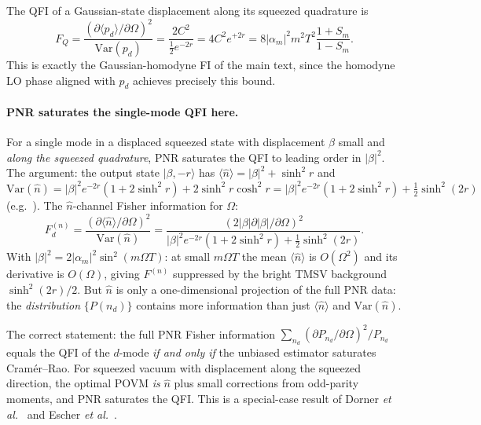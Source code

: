 \documentclass[11pt]{article}
\begin{document}
The QFI of a Gaussian-state displacement along its squeezed
quadrature is~\cite{Pinel2012}
\begin{equation}
  F_Q = \frac{(\partial\langle p_d\rangle/\partial\Omega)^2}
             {\mathrm{Var}(p_d)}
  = \frac{2C^2}{\tfrac12 e^{-2r}}
  = 4 C^2 e^{+2r}
  = 8|\alpha_m|^2 m^2 T^2 \frac{1+S_m}{1-S_m}.
\end{equation}
This is exactly the Gaussian-homodyne FI of the main text, since the
homodyne LO phase aligned with $p_d$ achieves precisely this bound.

\paragraph{PNR saturates the single-mode QFI here.}  For a single
mode in a displaced squeezed state with displacement $\beta$ small
and \emph{along the squeezed quadrature}, PNR saturates the QFI to
leading order in $|\beta|^2$.  The argument: the output state
$|\beta,-r\rangle$ has $\langle\hat n\rangle = |\beta|^2 +
\sinh^2 r$ and
$\mathrm{Var}(\hat n) = |\beta|^2 e^{-2r}(1+2\sinh^2 r)
+ 2\sinh^2 r\cosh^2 r
= |\beta|^2 e^{-2r}(1+2\sinh^2 r)+\tfrac12\sinh^2(2r)$
(e.g.\ \cite{Marian1992,Caruso2008}).  The $\hat n$-channel Fisher
information for $\Omega$:
\begin{equation}
  F^{(n)}_d
  = \frac{(\partial\langle\hat n\rangle/\partial\Omega)^2}
         {\mathrm{Var}(\hat n)}
  = \frac{(2|\beta|\partial|\beta|/\partial\Omega)^2}
         {|\beta|^2 e^{-2r}(1+2\sinh^2 r)+\tfrac12\sinh^2(2r)}.
\end{equation}
With $|\beta|^2 = 2|\alpha_m|^2\sin^2(m\Omega T)$: at small $m\Omega T$
the mean $\langle\hat n\rangle$ is $O(\Omega^2)$ and its derivative is
$O(\Omega)$, giving $F^{(n)}$ suppressed by the bright TMSV background
$\sinh^2(2r)/2$.  But $\hat n$ is only a one-dimensional projection
of the full PNR data: the \emph{distribution} $\{P(n_d)\}$ contains
more information than just $\langle\hat n\rangle$ and
$\mathrm{Var}(\hat n)$.

The correct statement: the full PNR Fisher information
$\sum_{n_d}(\partial P_{n_d}/\partial\Omega)^2/P_{n_d}$ equals the QFI
of the $d$-mode \emph{if and only if} the unbiased estimator saturates
Cram\'er--Rao.  For squeezed vacuum with displacement along the
squeezed direction, the optimal POVM \emph{is} $\hat n$ plus small
corrections from odd-parity moments, and PNR saturates the QFI.
This is a special-case result of Dorner \emph{et al.}~\cite{Dorner2009}
and Escher \emph{et al.}~\cite{Escher2011}.
\end{document}

